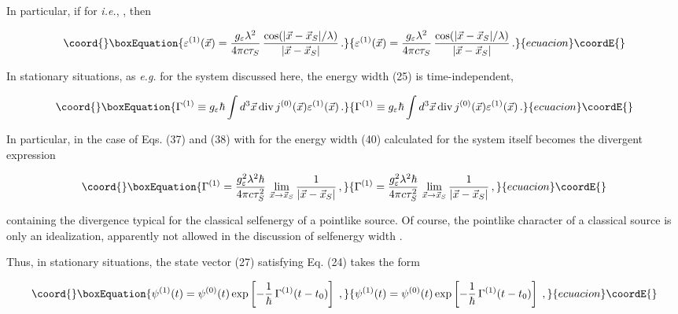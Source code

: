 \documentclass[a4paper,12pt]{article}
\begin{document}
\ni In particular, if \coordHE{} for \coordHE{} {\it i.e.}, \coordHE{}, then

\begin{equation}\coord{}\boxEquation{
\varepsilon^{(1)}(\vec{x}) = \frac{g_\varepsilon \lambda^2}{4\pi c \tau_S}\, \frac{\cos (|\vec{x}-\vec{x}_S| /\lambda)}{|\vec{x}-\vec{x}_S|}\,.
}{
\varepsilon^{(1)}(\vec{x}) = \frac{g_\varepsilon \lambda^2}{4\pi c \tau_S}\, \frac{\cos (|\vec{x}-\vec{x}_S| /\lambda)}{|\vec{x}-\vec{x}_S|}\,.
}{ecuacion}\coordE{}\end{equation}

In stationary situations, as {\it e.g.} for the system discussed here, the energy width (25) is time-independent,

\begin{equation}\coord{}\boxEquation{
\Gamma^{(1)} \equiv g_\varepsilon \hbar \int d^3\vec{x}\,{\rm div}\, j^{(0)}(\vec{x}) \varepsilon^{ (1)}(\vec{x}) \,.
}{
\Gamma^{(1)} \equiv g_\varepsilon \hbar \int d^3\vec{x}\,{\rm div}\, j^{(0)}(\vec{x}) \varepsilon^{ (1)}(\vec{x}) \,.
}{ecuacion}\coordE{}\end{equation}

\ni In particular, in the case of Eqs. (37) and (38) with \coordHE{} for \coordHE{} the energy width (40) calculated for the system itself becomes the divergent expression

\begin{equation}\coord{}\boxEquation{
\Gamma^{(1)} = \frac{g^2_\varepsilon \lambda^2 \hbar}{4\pi c \tau_S^2}\, \lim_{\vec{x} \rightarrow \vec{x}_S} \frac{1}{|\vec{x}-\vec{x}_S|} \,,
}{
\Gamma^{(1)} = \frac{g^2_\varepsilon \lambda^2 \hbar}{4\pi c \tau_S^2}\, \lim_{\vec{x} \rightarrow \vec{x}_S} \frac{1}{|\vec{x}-\vec{x}_S|} \,,
}{ecuacion}\coordE{}\end{equation}

\ni containing the divergence typical for the classical selfenergy of a pointlike source. Of course, the pointlike character of a classical source is only an idealization, apparently not allowed in the discussion of selfenergy width \coordHE{}.

Thus, in stationary situations, the state vector (27) satisfying Eq. (24) takes the form

\begin{equation}\coord{}\boxEquation{
\psi^{(1)}(t) = \psi^{(0)}(t) \exp\left[ -\frac{1}{\hbar}\, \Gamma^{(1)}(t - t_0)\right] \;,
}{
\psi^{(1)}(t) = \psi^{(0)}(t) \exp\left[ -\frac{1}{\hbar}\, \Gamma^{(1)}(t - t_0)\right] \;,
}{ecuacion}\coordE{}\end{equation}
\end{document}
